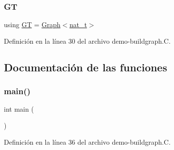 \subsubsection{\texorpdfstring{GT}{GT}}
{\footnotesize\ttfamily using \hyperlink{demo-buildgraph_8_c_a3001c40d2c31ca87ed96cd7d1334a55e}{GT} =  \hyperlink{class_designar_1_1_graph}{Graph}$<$\hyperlink{namespace_designar_aa72662848b9f4815e7bf31a7cf3e33d1}{nat\+\_\+t}$>$}



Definición en la línea 30 del archivo demo-\/buildgraph.\+C.



\subsection{Documentación de las funciones}
\mbox{\label{demo-buildgraph_8_c_ae66f6b31b5ad750f1fe042a706a4e3d4}} 
\subsubsection{\texorpdfstring{main()}{main()}}
{\footnotesize\ttfamily int main (\begin{DoxyParamCaption}{ }\end{DoxyParamCaption})}



Definición en la línea 36 del archivo demo-\/buildgraph.\+C.


